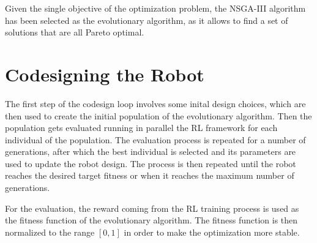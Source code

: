 Given the single objective of the optimization problem, the \ac{NSGA}-III algorithm has been selected as the evolutionary algorithm, as it allows to find a set of solutions that are all Pareto optimal.



\section{Codesigning the Robot}

The first step of the codesign loop involves some inital design choices, which are then used to create the initial population of the evolutionary algorithm. Then the population gets evaluated running in parallel the \ac{RL} framework for each individual of the population. The evaluation process is repeated for a number of generations, after which the best individual is selected and its parameters are used to update the robot design. The process is then repeated until the robot reaches the desired target fitness or when it reaches the maximum number of generations.

For the evaluation, the reward coming from the \ac{RL} training process is used as the fitness function of the evolutionary algorithm. The fitness function is then normalized to the range $[0,1]$ in order to make the optimization more stable.
